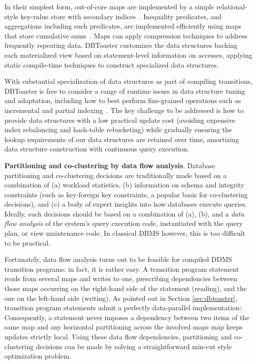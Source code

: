 In their simplest form, out-of-core maps are implemented by a simple
relational-style key-value store with secondary indices~\cite{berkeleydb}.
Inequality predicates, and aggregations including such predicates, are
implemented efficiently using maps that store cumulative
sums~\cite{rangequeries}.  Maps can apply compression techniques to address
frequently repeating data.
DBToaster customizes the data structures backing each materialized view based
on statement-level information on accesses, applying static compile-time
techniques to construct specialized data structures.

With substantial specialization of data structures as part of compiling
transitions, DBToaster is free to consider a range of runtime issues in data
structure tuning and adaptation, including how to best perform fine-grained
operations such as incremental and partial
indexing~\cite{stonebreaker-sigrec:89}. The key challenge to be addressed is how
to provide data structures with a low practical update cost (avoiding expensive
index rebalancing and hash-table rebucketing) while gradually ensuring the
lookup requirements of our data structures are retained over time, amortizing
data structure construction with continuous query execution.


\noindent
{\bf Partitioning and co-clustering by data flow analysis}.
%
Database partitioning and co-clustering decisions
are traditionally made based on a combination of
(a) workload statistics, (b) information on schema and integrity constraints
(such as key-foreign key constraints, a popular basis for co-clustering
decisions), and (c) a body of expert insights into how databases execute
queries. Ideally, such decisions should be based on a combination
of (a), (b), and a {\em data flow analysis}\/ of the system's query execution code,
instantiated with the query plan, or view maintenance code. In classical
DBMS however, this is too difficult to be practical.

Fortunately, data flow analysis turns out to be feasible for compiled DDMS
transition programs: in fact, it is rather easy. A transition program statement
reads from several maps and writes to one, prescribing dependencies between
those maps occurring on the right-hand side of the statement (reading), and the
one on the left-hand side (writing). As pointed out in Section
\ref{sec:dbtoaster}, transition program statements admit a perfectly
data-parallel implementation: Consequently, a statement never imposes a
dependency between two items of the same map and any horizontal partitioning
across the involved maps map keeps updates strictly local.
%
Using these data flow dependencies, partitioning and co-clustering
decisions can be made by
solving a straightforward min-cut style optimization problem.



